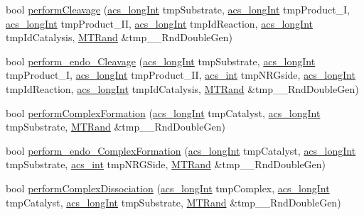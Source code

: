 \begin{DoxyCompactItemize}
\item 
bool \hyperlink{classenvironment_aa4ed307a123c402166cfc7f6ed99043a}{perform\-Cleavage} (\hyperlink{acs__headers_8h_a19319d75f02db4308bc5c0026d98cd85}{acs\-\_\-long\-Int} tmp\-Substrate, \hyperlink{acs__headers_8h_a19319d75f02db4308bc5c0026d98cd85}{acs\-\_\-long\-Int} tmp\-Product\-\_\-\-I, \hyperlink{acs__headers_8h_a19319d75f02db4308bc5c0026d98cd85}{acs\-\_\-long\-Int} tmp\-Product\-\_\-\-I\-I, \hyperlink{acs__headers_8h_a19319d75f02db4308bc5c0026d98cd85}{acs\-\_\-long\-Int} tmp\-Id\-Reaction, \hyperlink{acs__headers_8h_a19319d75f02db4308bc5c0026d98cd85}{acs\-\_\-long\-Int} tmp\-Id\-Catalysis, \hyperlink{class_m_t_rand}{M\-T\-Rand} \&tmp\-\_\-\-\_\-\-Rnd\-Double\-Gen)
\item 
bool \hyperlink{classenvironment_ade26b82a3b48a5bda7e5751cbfd31b04}{perform\-\_\-endo\-\_\-\-Cleavage} (\hyperlink{acs__headers_8h_a19319d75f02db4308bc5c0026d98cd85}{acs\-\_\-long\-Int} tmp\-Substrate, \hyperlink{acs__headers_8h_a19319d75f02db4308bc5c0026d98cd85}{acs\-\_\-long\-Int} tmp\-Product\-\_\-\-I, \hyperlink{acs__headers_8h_a19319d75f02db4308bc5c0026d98cd85}{acs\-\_\-long\-Int} tmp\-Product\-\_\-\-I\-I, \hyperlink{acs__headers_8h_a8d277355641a098190360234e2ebde35}{acs\-\_\-int} tmp\-N\-R\-Gside, \hyperlink{acs__headers_8h_a19319d75f02db4308bc5c0026d98cd85}{acs\-\_\-long\-Int} tmp\-Id\-Reaction, \hyperlink{acs__headers_8h_a19319d75f02db4308bc5c0026d98cd85}{acs\-\_\-long\-Int} tmp\-Id\-Catalysis, \hyperlink{class_m_t_rand}{M\-T\-Rand} \&tmp\-\_\-\-\_\-\-Rnd\-Double\-Gen)
\item 
bool \hyperlink{classenvironment_ab50605f871505a3ab9215552cac90790}{perform\-Complex\-Formation} (\hyperlink{acs__headers_8h_a19319d75f02db4308bc5c0026d98cd85}{acs\-\_\-long\-Int} tmp\-Catalyst, \hyperlink{acs__headers_8h_a19319d75f02db4308bc5c0026d98cd85}{acs\-\_\-long\-Int} tmp\-Substrate, \hyperlink{class_m_t_rand}{M\-T\-Rand} \&tmp\-\_\-\-\_\-\-Rnd\-Double\-Gen)
\item 
bool \hyperlink{classenvironment_aa85e7ddc4de7bdfe70b3828a300edeb8}{perform\-\_\-endo\-\_\-\-Complex\-Formation} (\hyperlink{acs__headers_8h_a19319d75f02db4308bc5c0026d98cd85}{acs\-\_\-long\-Int} tmp\-Catalyst, \hyperlink{acs__headers_8h_a19319d75f02db4308bc5c0026d98cd85}{acs\-\_\-long\-Int} tmp\-Substrate, \hyperlink{acs__headers_8h_a8d277355641a098190360234e2ebde35}{acs\-\_\-int} tmp\-N\-R\-G\-Side, \hyperlink{class_m_t_rand}{M\-T\-Rand} \&tmp\-\_\-\-\_\-\-Rnd\-Double\-Gen)
\item 
bool \hyperlink{classenvironment_a5c5e57b0558067cbf55c894f33d0a121}{perform\-Complex\-Dissociation} (\hyperlink{acs__headers_8h_a19319d75f02db4308bc5c0026d98cd85}{acs\-\_\-long\-Int} tmp\-Complex, \hyperlink{acs__headers_8h_a19319d75f02db4308bc5c0026d98cd85}{acs\-\_\-long\-Int} tmp\-Catalyst, \hyperlink{acs__headers_8h_a19319d75f02db4308bc5c0026d98cd85}{acs\-\_\-long\-Int} tmp\-Substrate, \hyperlink{class_m_t_rand}{M\-T\-Rand} \&tmp\-\_\-\-\_\-\-Rnd\-Double\-Gen)

\end{DoxyCompactItemize}
